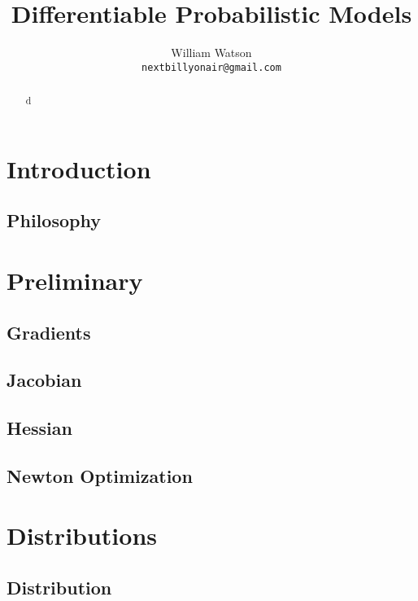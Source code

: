 \documentclass{article}
\title{Differentiable Probabilistic Models}
\author{%
  William Watson \\
  \texttt{nextbillyonair@gmail.com} \\
}
\begin{document}

\maketitle

\begin{abstract}
  d
\end{abstract}

\newpage
\tableofcontents


\section{Introduction}
\subsection{Philosophy}

\section{Preliminary}
\subsection{Gradients}
\subsection{Jacobian}
\subsection{Hessian}
\subsection{Newton Optimization}

\section{Distributions}
\subsection{Distribution}
\end{document}
